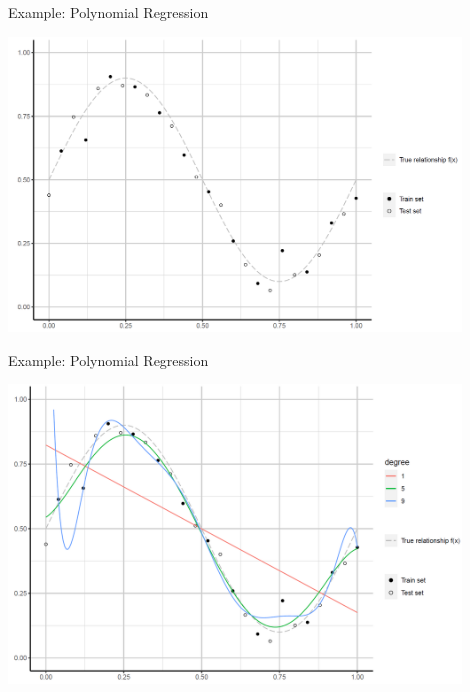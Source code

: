 \begin{frame}{Example: Polynomial Regression}
\scriptsize

\begin{center}
\includegraphics[width=0.9\textwidth]{plots/test_error01.png}
\end{center}

\normalsize 
\end{frame}


\begin{frame}{Example: Polynomial Regression}
\scriptsize

\begin{center}
\includegraphics[width=0.9\textwidth]{plots/test_error02.png}
\end{center}

\normalsize 
\end{frame}


